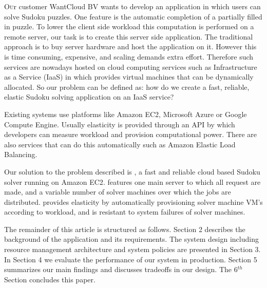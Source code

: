\lettrine[nindent=0em,lines=3]{O}ur customer WantCloud BV wants to develop an application in which users can solve Sudoku puzzles.
One feature is the automatic completion of a partially filled in puzzle.
To lower the client side workload this computation is performed on a remote server, our task is to create this server side application.
The traditional approach is to buy server hardware and host the application on it.
However this is time consuming, expensive, and scaling demands extra effort.
Therefore such services are nowadays hosted on cloud computing services such as Infrastructure as a Service (IaaS) in which provides virtual machines that can be dynamically allocated.
So our problem can be defined as: how do we create a fast, reliable, elastic Sudoku solving application on an IaaS service?

Existing systems use platforms like Amazon EC2\cite{ec2}, Microsoft Azure\cite{azure} or Google Compute Engine\cite{google}.
Usually elasticity is provided through an API by which developers can measure workload and provision computational power.
There are also services that can do this automatically such as Amazon Elastic Load Balancing. 

Our solution to the problem described is \appName{}, a fast and reliable cloud based Sudoku solver running on Amazon EC2\cite{ec2}. 
\appName{} features one main server to which all request are made, and a variable number of solver machines over which the jobs are distributed.
\appName{} provides elasticity by automatically provisioning solver machine VM's according to workload, and is resistant to system failures of solver machines.

The remainder of this article is structured as follows.
Section 2 describes the background of the application and its requirements.
The system design including resource management architecture and system policies are presented in Section 3.
In Section 4 we evaluate the performance of our system in production. Section 5 summarizes our main findings and discusses tradeoffs in our design.
The 6$^{th}$ Section concludes this paper. 

